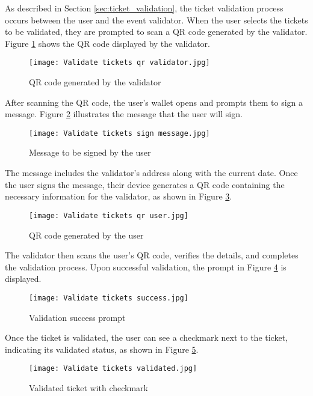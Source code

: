 As described in Section \ref{sec:ticket_validation}, the ticket validation
process occurs between the user and the event validator. When the user selects
the tickets to be validated, they are prompted to scan a QR code generated by
the validator. Figure \ref{fig:validate_tickets_qr_validator} shows the QR code
displayed by the validator.

\begin{figure}[H]
    \texttt{[image: Validate tickets qr validator.jpg]}
    \centering
    \caption{QR code generated by the validator}
    \label{fig:validate_tickets_qr_validator}
\end{figure}

After scanning the QR code, the user's wallet opens and prompts them to sign a
message. Figure \ref{fig:validate_tickets_sign_message} illustrates the message
that the user will sign.

\begin{figure}[H]
    \texttt{[image: Validate tickets sign message.jpg]}
    \centering
    \caption{Message to be signed by the user}
    \label{fig:validate_tickets_sign_message}
\end{figure}

The message includes the validator's address along with the current date. Once
the user signs the message, their device generates a QR code containing the
necessary information for the validator, as shown in Figure
\ref{fig:validate_tickets_qr_user}.

\begin{figure}[H]
    \texttt{[image: Validate tickets qr user.jpg]}
    \centering
    \caption{QR code generated by the user}
    \label{fig:validate_tickets_qr_user}
\end{figure}

The validator then scans the user's QR code, verifies the details, and
completes the validation process. Upon successful validation, the prompt in
Figure \ref{fig:validate_tickets_success} is displayed.

\begin{figure}[H]
    \texttt{[image: Validate tickets success.jpg]}
    \centering
    \caption{Validation success prompt}
    \label{fig:validate_tickets_success}
\end{figure}

Once the ticket is validated, the user can see a checkmark next to the ticket,
indicating its validated status, as shown in Figure
\ref{fig:validate_tickets_validated}.

\begin{figure}[H]
    \texttt{[image: Validate tickets validated.jpg]}
    \centering
    \caption{Validated ticket with checkmark}
    \label{fig:validate_tickets_validated}
\end{figure}
